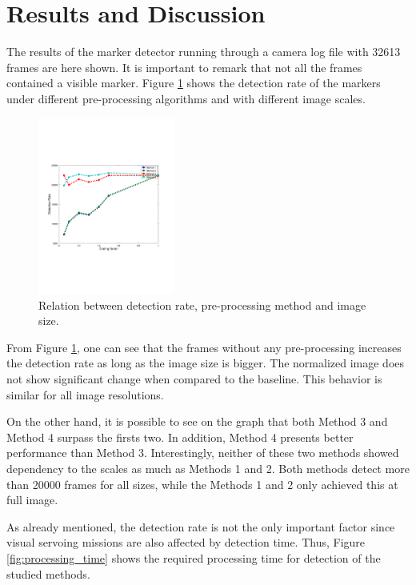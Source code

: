\documentclass[conference, letterpaper]{IEEEtran}
\begin{document}
\section{Results and Discussion} \label{sec:results}

The results of the marker detector running through a camera log file with 32613
frames are here shown. It is important to remark that not all the frames
contained a visible marker. Figure \ref{fig:detection_rate} shows the detection
rate of the markers under different pre-processing algorithms and with
different image scales. 

\begin{figure}[!ht]
	\centering
    \includegraphics[width=0.4\textwidth, trim={1.6cm 6.9cm 2.3cm 6.7cm}]{./fig/detection_rate_emb.pdf}
    \caption{Relation between detection rate, pre-processing method and image size.}
	\label{fig:detection_rate}
\end{figure}

From Figure \ref{fig:detection_rate}, one can see that the frames without any
pre-processing increases the detection rate as long as the image size is bigger.
The normalized image does not show significant change when compared to the
baseline. This behavior is similar for all image resolutions.

On the other hand, it is possible to see on the graph that both Method 3 and
Method 4 surpass the firsts two. In addition, Method 4 presents better performance
than Method 3. Interestingly, neither of these two methods showed dependency to
the scales as much as Methods 1 and 2. Both methods detect more than
20000 frames for all sizes, while the Methods 1 and 2 only achieved this at
full image. 

As already mentioned, the detection rate is not the only important factor since
visual servoing missions are also affected by detection time. Thus, Figure
\ref{fig:processing_time} shows the required processing time for detection of
the studied methods.
\end{document}
